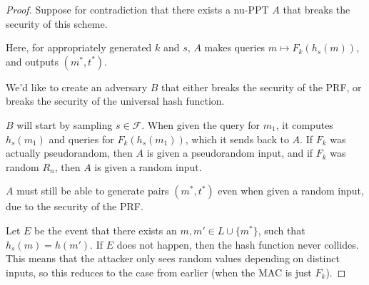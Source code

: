 \documentclass[12pt]{tufte-book}
\begin{document}
\begin{proof}
    Suppose for contradiction that there exists a nu-PPT $A$ that breaks the security of this scheme.

    Here, for appropriately generated $k$ and $s$, $A$ makes queries $m \mapsto F_k(h_s(m))$, and outputs $(m^*, t^*)$.

    We'd like to create an adversary $B$ that either breaks the security of the PRF, or breaks the security of the universal hash function.

    $B$ will start by sampling $s \in \mathcal{F}$. When given the query for $m_1$, it computes $h_s(m_1)$ and queries for $F_k(h_s(m_1))$, which it sends back to $A$. If $F_k$ was actually pseudorandom, then $A$ is given a pseudorandom input, and if $F_k$ was random $R_n$, then $A$ is given a random input.

    $A$ must still be able to generate pairs $(m^*, t^*)$ even when given a random input, due to the security of the PRF.

    \begin{center}
    \end{center}

    Let $E$ be the event that there exists an $m, m' \in L \cup \{m^*\}$, such that $h_s(m) = h(m')$. If $E$ does not happen, then the hash function never collides. This means that the attacker only sees random values depending on distinct inputs, so this reduces to the case from earlier (when the MAC is just $F_k$).


\end{proof}
\end{document}
